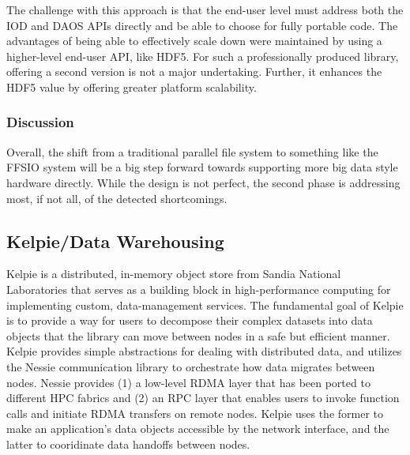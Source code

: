 The challenge with this approach is that the end-user level must address both
the IOD and DAOS APIs directly and be able to choose for fully portable code.
The advantages of being able to effectively scale down were maintained by using
a higher-level end-user API, like HDF5. For such a professionally produced
library, offering a second version is not a major undertaking. Further, it
enhances the HDF5 value by offering greater platform scalability.

\subsubsection{Discussion}
Overall, the shift from a traditional parallel file system to something like
the FFSIO system will be a big step forward towards supporting more big data
style hardware directly. While the design is not perfect, the second phase is
addressing most, if not all, of the detected shortcomings. 

\subsection{Kelpie/Data Warehousing}

Kelpie is a distributed, in-memory object store from Sandia National
Laboratories that serves as a building block in high-performance computing for
implementing custom, data-management services. The fundamental goal of Kelpie
is to provide a way for users to decompose their complex datasets into data
objects that the library can move between nodes in a safe but efficient manner.
Kelpie provides simple abstractions for dealing with distributed data, and
utilizes the Nessie communication library to orchestrate how data migrates
between nodes. Nessie provides (1) a low-level RDMA layer that has been ported
to different HPC fabrics and (2) an RPC layer that enables users to invoke
function calls and initiate RDMA transfers on remote nodes. Kelpie uses the
former to make an application's data objects accessible by the network
interface, and the latter to cooridinate data handoffs between nodes.

